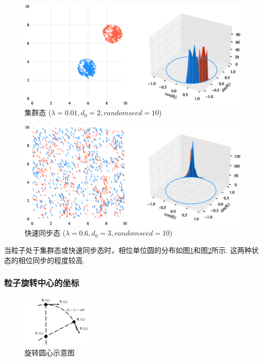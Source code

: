 \documentclass{article}
\begin{document}
\begin{figure}[H]
	\centering
	\includegraphics[width=\textwidth]{./figs/CorrectCoupling_uniform_0.010_2.00.eps}
	\vspace{-1cm}
	\caption{集群态 ($\lambda=0.01, d_0=2, random seed=10$)}
	\label{fig:fig231.3}
\end{figure}

\begin{figure}[H]
	\centering
	\includegraphics[width=\textwidth]{./figs/CorrectCoupling_uniform_0.600_3.00.eps}
	\vspace{-1cm}
	\caption{快速同步态 ($\lambda=0.6, d_0=3, random seed=10$)}
	\label{fig:fig231.4}
\end{figure}

当粒子处于集群态或快速同步态时，相位单位圆的分布如图\ref{fig:fig231.3}和图\ref{fig:fig231.4}所示. 这两种状态的相位同步的程度较高.

\newpage
\subsubsection{粒子旋转中心的坐标}

\begin{figure}[H]
	\centering
	\includegraphics[width=0.3\textwidth]{./figs/CenterEps.pdf}
	\vspace{-0.2cm}
	\caption{旋转圆心示意图}
	\label{fig:fig232.1}
\end{figure}
\end{document}
